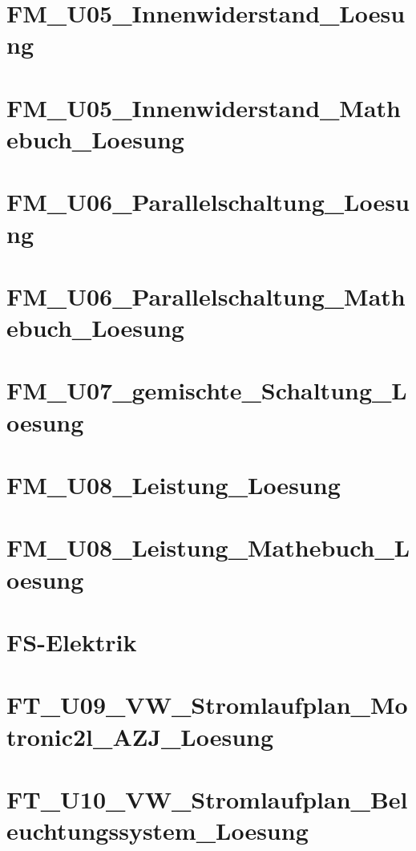 \chapter{FM_U05_Innenwiderstand_Loesung}
%
\chapter{FM_U05_Innenwiderstand_Mathebuch_Loesung}
%
\chapter{FM_U06_Parallelschaltung_Loesung}
%
\chapter{FM_U06_Parallelschaltung_Mathebuch_Loesung}
%
\chapter{FM_U07_gemischte_Schaltung_Loesung}
%
\chapter{FM_U08_Leistung_Loesung}
%
\chapter{FM_U08_Leistung_Mathebuch_Loesung}
%
\chapter{FS-Elektrik}
%
\chapter{FT_U09_VW_Stromlaufplan_Motronic2l_AZJ_Loesung}
%
\chapter{FT_U10_VW_Stromlaufplan_Beleuchtungssystem_Loesung}
%

